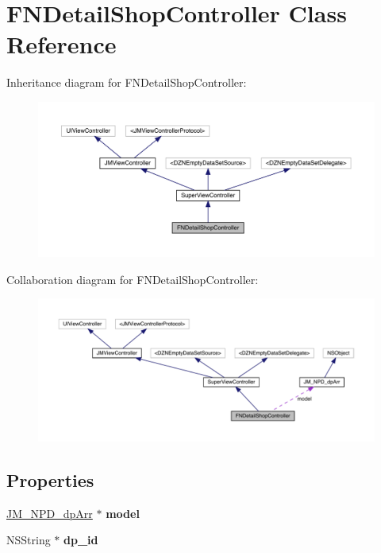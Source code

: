 \hypertarget{interface_f_n_detail_shop_controller}{}\section{F\+N\+Detail\+Shop\+Controller Class Reference}
\label{interface_f_n_detail_shop_controller}


Inheritance diagram for F\+N\+Detail\+Shop\+Controller\+:\nopagebreak
\begin{figure}[H]
\begin{center}
\leavevmode
\includegraphics[width=350pt]{interface_f_n_detail_shop_controller__inherit__graph}
\end{center}
\end{figure}


Collaboration diagram for F\+N\+Detail\+Shop\+Controller\+:\nopagebreak
\begin{figure}[H]
\begin{center}
\leavevmode
\includegraphics[width=350pt]{interface_f_n_detail_shop_controller__coll__graph}
\end{center}
\end{figure}
\subsection*{Properties}
\begin{DoxyCompactItemize}
\item 
\mbox{\label{interface_f_n_detail_shop_controller_a10d044bb8f6c340f93307ab4125fd54f}} 
\mbox{\hyperlink{interface_j_m___n_p_d__dp_arr}{J\+M\+\_\+\+N\+P\+D\+\_\+dp\+Arr}} $\ast$ {\bfseries model}
\item 
\mbox{\label{interface_f_n_detail_shop_controller_ae38f6e6175e497815ab2f43e7812fb2d}} 
N\+S\+String $\ast$ {\bfseries dp\+\_\+id}
\end{DoxyCompactItemize}
